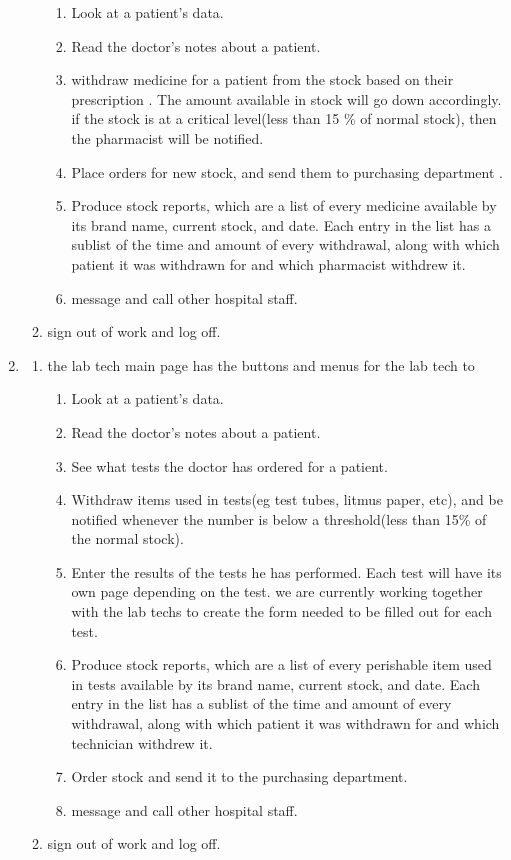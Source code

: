 \documentclass[14pt]{article}
\begin{document}
\begin{enumerate}
\begin{enumerate}
\begin{enumerate}
					\item Look at a patient's data.
					\item Read the doctor's notes about a patient.
					\item withdraw medicine for a patient from the stock based on their 
					prescription . The amount available in stock will go down accordingly. if the
					stock is at a critical level(less than 15 \% of normal stock), then the pharmacist will be notified.
					\item Place orders for new stock, and send them to purchasing department .
					\item Produce stock reports, which are a list of every medicine available by its brand name, current stock, and date. 
					Each entry in the list has a sublist of the time and amount of every withdrawal, along with which patient it was withdrawn
					for and which pharmacist withdrew it.
					\item message and call other hospital staff.
				\end{enumerate}
			\item sign out of work and log off.
		  \end{enumerate}
		  
		\item \begin{enumerate}
		\item the lab tech main page has the buttons and menus for the lab tech to 
				\begin{enumerate}
					\item Look at a patient's data.
					\item Read the doctor's notes about a patient.
					\item See what tests the doctor has ordered for a patient.
					\item Withdraw items used in tests(eg test tubes, litmus paper, etc), and be notified whenever the
					number is below a threshold(less than 15\% of the normal stock).
					\item Enter the results of the tests he has performed. Each test will have its own page depending on the test. 
					we are currently working together with the lab techs to create the form needed to be filled out for each test.
					\item Produce stock reports, which are a list of every perishable 
					item used in tests available by its brand name, current stock, and date. 
					Each entry in the list has a sublist of the time and amount of every withdrawal, along with which patient it
					was withdrawn for and which technician withdrew it.
					\item Order stock and send it to the purchasing department.
					\item message and call other hospital staff.
				\end{enumerate}
			\item sign out of work and log off.
		  \end{enumerate}
		  

\end{enumerate}
\end{document}
